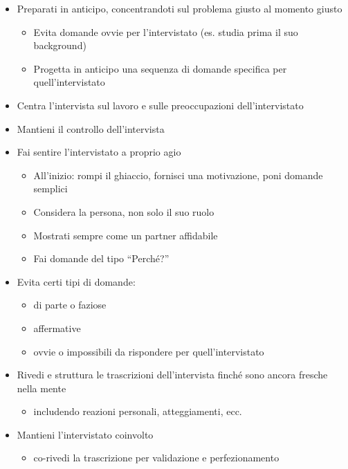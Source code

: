 \documentclass[../main.tex]{subfiles}
\begin{document}
\begin{itemize}
    \item Preparati in anticipo, concentrandoti sul problema giusto al momento giusto
    \begin{itemize}
        \item Evita domande ovvie per l’intervistato (es. studia prima il suo background)
        \item Progetta in anticipo una sequenza di domande specifica per quell’intervistato
    \end{itemize}

    \item Centra l’intervista sul lavoro e sulle preoccupazioni dell’intervistato
    \item Mantieni il controllo dell’intervista
    \item Fai sentire l’intervistato a proprio agio
    \begin{itemize}
        \item All’inizio: rompi il ghiaccio, fornisci una motivazione, poni domande semplici
        \item Considera la persona, non solo il suo ruolo
        \item Mostrati sempre come un partner affidabile
        \item Fai domande del tipo ``Perché?''
    \end{itemize}

    \item Evita certi tipi di domande:
    \begin{itemize}
        \item di parte o faziose
        \item affermative
        \item ovvie o impossibili da rispondere per quell’intervistato
    \end{itemize}

    \item Rivedi e struttura le trascrizioni dell’intervista finché sono ancora fresche nella mente
    \begin{itemize}
        \item includendo reazioni personali, atteggiamenti, ecc.
    \end{itemize}

    \item Mantieni l’intervistato coinvolto
    \begin{itemize}
        \item co-rivedi la trascrizione per validazione e perfezionamento
    \end{itemize}
\end{itemize}
\end{document}
